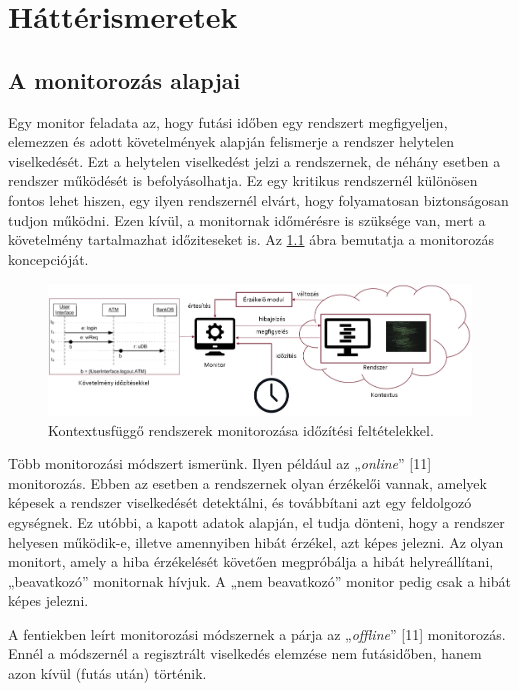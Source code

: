 \chapter{Háttérismeretek}\section{A monitorozás alapjai}

Egy monitor feladata az, hogy futási időben egy rendszert megfigyeljen, elemezzen és adott követelmények alapján felismerje a rendszer helytelen viselkedését.
Ezt a helytelen viselkedést jelzi a rendszernek, de néhány esetben a rendszer működését is befolyásolhatja.
Ez egy kritikus rendszernél különösen fontos lehet hiszen, egy ilyen rendszernél elvárt, hogy folyamatosan biztonságosan tudjon működni.
Ezen kívül, a monitornak időmérésre is szüksége van, mert a követelmény tartalmazhat időziteseket is.
Az \ref{introductory_figure} ábra bemutatja a monitorozás koncepcióját.

\begin{figure}[!ht]
    \includegraphics[width=150mm, keepaspectratio]{figures/introductory_figure.png}
    \caption{Kontextusfüggő rendszerek monitorozása időzítési feltételekkel.}
    \label{introductory_figure}
\end{figure}

Több monitorozási módszert ismerünk.
Ilyen például az „\textit{online}” [11] monitorozás.
Ebben az esetben a rendszernek olyan érzékelői vannak, amelyek képesek a rendszer viselkedését detektálni, és továbbítani azt egy feldolgozó egységnek.
Ez utóbbi, a kapott adatok alapján, el tudja dönteni, hogy a rendszer helyesen működik-e, illetve amennyiben hibát érzékel, azt képes jelezni.
Az olyan monitort, amely a hiba érzékelését követően megpróbálja a hibát helyreállítani, „beavatkozó” monitornak hívjuk.
A „nem beavatkozó” monitor pedig csak a hibát képes jelezni.

A fentiekben leírt monitorozási módszernek a párja az „\textit{offline}” [11] monitorozás.
Ennél a módszernél a regisztrált viselkedés elemzése nem futásidőben, hanem azon kívül (futás után) történik.

